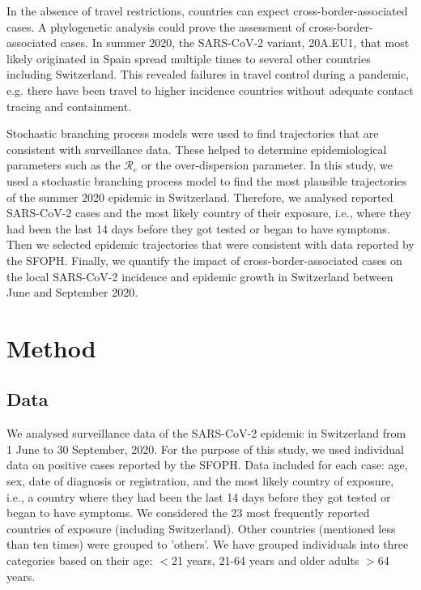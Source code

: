 \documentclass[10pt, a4paper, twoside]{article}
\begin{document}
\begin{multicols}{2}
In the absence of travel restrictions, countries can expect cross-border-associated cases.\cite{russell_effect_2021} 
A phylogenetic analysis could prove the assessment of cross-border-associated cases.\cite{hodcroft_emergence_2020}
In summer 2020, the SARS-CoV-2 variant, 20A.EU1, that most likely originated in Spain spread multiple times to several other countries including Switzerland.\cite{hodcroft_emergence_2020}
This revealed failures in travel control during a pandemic, e.g. there have been travel to higher incidence countries without adequate contact tracing and containment.\cite{hodcroft_emergence_2020}

Stochastic branching process models were used to find trajectories that are consistent with surveillance data.\cite{althaus_ebola_2015,riou_pattern_2020}
These helped to determine epidemiological parameters such as the $\mathcal{R}_e$ or the over-dispersion parameter.\cite{althaus_ebola_2015,riou_pattern_2020}
In this study, we used a stochastic branching process model to find the most plausible trajectories of the summer 2020 epidemic in Switzerland.
Therefore, we analysed reported SARS-CoV-2 cases and the most likely country of their exposure, i.e., where they had been the last 14 days before they got tested or began to have symptoms.
Then we selected epidemic trajectories that were consistent with data reported by the SFOPH.
Finally, we quantify the impact of cross-border-associated cases on the local SARS-CoV-2 incidence and epidemic growth in Switzerland between June and September 2020.

\section{Method}

\subsection{Data}
We analysed surveillance data of the SARS-CoV-2 epidemic in Switzerland from 1 June to 30 September, 2020. 
For the purpose of this study, we used individual data on positive cases reported by the SFOPH. 
Data included for each case: age, sex, date of diagnosis or registration, and the most likely country of exposure, i.e., a country where they had been the last 14 days before they got tested or began to have symptoms.
We considered the 23 most frequently reported countries of exposure (including Switzerland).
Other countries (mentioned less than ten times) were grouped to 'others'.
We have grouped individuals into three categories based on their age: $<$21 years, 21-64 years and older adults $>$64 years.


\end{multicols}
\end{document}
